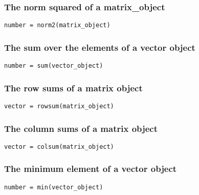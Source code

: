 \documentclass{admbmanual}
\begin{document}
\subsubsection{The norm squared of a matrix\_object}
\begin{lstlisting}
number = norm2(matrix_object)
\end{lstlisting}
\bigskip


\subsubsection{The sum over the elements of a vector object}
\begin{lstlisting}
number = sum(vector_object)
\end{lstlisting}
\bigskip


\subsubsection{The row sums of a matrix object}
\begin{lstlisting}
vector = rowsum(matrix_object)
\end{lstlisting}
\bigskip

\subsubsection{The column sums of a matrix object}
\begin{lstlisting}
vector = colsum(matrix_object)
\end{lstlisting}
\bigskip

\subsubsection{The minimum element of a vector object}
\begin{lstlisting}
number = min(vector_object)
\end{lstlisting}
\bigskip
\end{document}
